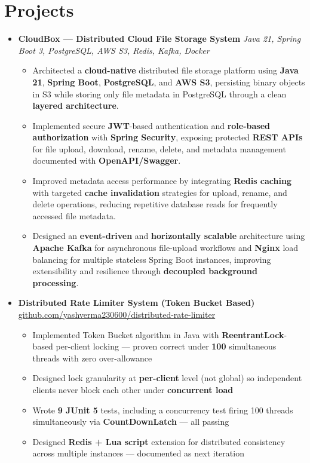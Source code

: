 \documentclass[letterpaper,11pt]{article}
\newcommand{\resumeItem}[1]{
  \item\small{{#1 \vspace{-2pt}}}
}
\newcommand{\resumeProjectHeading}[2]{
    \item
    \small #1\hfill \textbf{\small #2}\vspace{-7pt}
}
\newcommand{\resumeSubHeadingListStart}{\begin{itemize}[leftmargin=0.0in, label={}]}
\newcommand{\resumeSubHeadingListEnd}{\end{itemize}}
\newcommand{\resumeItemListStart}{\begin{itemize}}
\newcommand{\resumeItemListEnd}{\end{itemize}\vspace{-5pt}}
\begin{document}
\section{Projects}
  \resumeSubHeadingListStart
    \resumeProjectHeading
      {\textbf{CloudBox --- Distributed Cloud File Storage System} \textbar{} \textit{\small Java 21, Spring Boot 3, PostgreSQL, AWS S3, Redis, Kafka, Docker}}{}
      \resumeItemListStart
        \resumeItem{Architected a \textbf{cloud-native} distributed file storage platform using \textbf{Java 21}, \textbf{Spring Boot}, \textbf{PostgreSQL}, and \textbf{AWS S3}, persisting binary objects in S3 while storing only file metadata in PostgreSQL through a clean \textbf{layered architecture}.}
        \resumeItem{Implemented secure \textbf{JWT}-based authentication and \textbf{role-based authorization} with \textbf{Spring Security}, exposing protected \textbf{REST APIs} for file upload, download, rename, delete, and metadata management documented with \textbf{OpenAPI/Swagger}.}
        \resumeItem{Improved metadata access performance by integrating \textbf{Redis caching} with targeted \textbf{cache invalidation} strategies for upload, rename, and delete operations, reducing repetitive database reads for frequently accessed file metadata.}
        \resumeItem{Designed an \textbf{event-driven} and \textbf{horizontally scalable} architecture using \textbf{Apache Kafka} for asynchronous file-upload workflows and \textbf{Nginx} load balancing for multiple stateless Spring Boot instances, improving extensibility and resilience through \textbf{decoupled background processing}.}
      \resumeItemListEnd
    \resumeProjectHeading
      {\textbf{Distributed Rate Limiter System (Token Bucket Based)} \textbar{} \href{https://github.com/yashverma230600/distributed-rate-limiter}{github.com/yashverma230600/distributed-rate-limiter}}{}
      \resumeItemListStart
        \resumeItem{Implemented Token Bucket algorithm in Java with \textbf{ReentrantLock}-based per-client locking --- proven correct under \textbf{100} simultaneous threads with zero over-allowance}
        \resumeItem{Designed lock granularity at \textbf{per-client} level (not global) so independent clients never block each other under \textbf{concurrent load}}
        \resumeItem{Wrote \textbf{9 JUnit 5} tests, including a concurrency test firing 100 threads simultaneously via \textbf{CountDownLatch} --- all passing}
        \resumeItem{Designed \textbf{Redis + Lua script} extension for distributed consistency across multiple instances --- documented as next iteration}
      \resumeItemListEnd
  \resumeSubHeadingListEnd
\vspace{-8pt}
\end{document}
